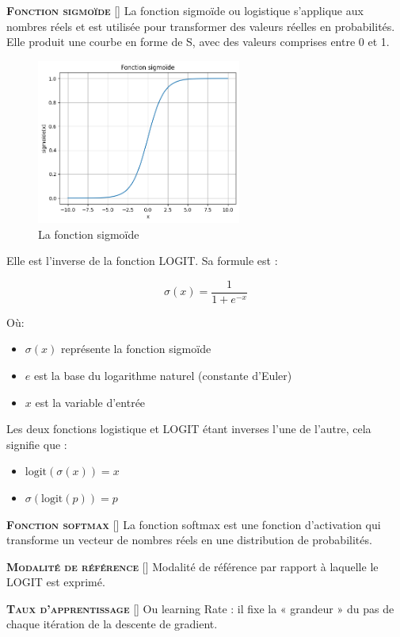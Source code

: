 \documentclass[10pt,french]{report}
\newcommand{\entreelex}[3][]{%
	{\large \textbf{\textsc{#2}}} %
	\if\relax\detokenize{#1}\relax %
	\else %
	\raisebox{0.15ex}{\scalebox{0.7}{$\Diamond$}} %
	[#1] %
	\fi
	\raisebox{0.13ex}{\scalebox{0.75}{$\blacksquare$}} #3 %
}
\begin{document}
	 \label{fonction sigmoïde}
	 \entreelex{Fonction sigmoïde}{La fonction sigmoïde ou logistique s'applique aux nombres réels et est utilisée pour transformer des valeurs réelles en probabilités. Elle produit une courbe en forme de S, avec des valeurs comprises entre 0 et 1.

	 \begin{figure}[h]
	 	\centering
	 	\includegraphics[width=0.6\textwidth]{f_sigmoide.png}
	 	\caption{La fonction sigmoïde}
	 	\label{fig:mesh1}
	 \end{figure}

	 Elle est l'inverse de la fonction LOGIT. Sa formule est :

 	\begin{equation}
 		\sigma(x) = \frac{1}{1 + e^{-x}}
 	\end{equation}

 	Où:
 	\begin{itemize}
 		\item $\sigma(x)$ représente la fonction sigmoïde
 		\item $e$ est la base du logarithme naturel (constante d'Euler)
 		\item $x$ est la variable d'entrée
 	\end{itemize}

 	Les deux fonctions logistique et LOGIT étant inverses l'une de l'autre, cela signifie que :
 	\begin{itemize}
 		\item $\text{logit}(\sigma(x)) = x$
 		\item $\sigma(\text{logit}(p)) = p$
	 \end{itemize}}

	 \label{fonction softmax}
	 \entreelex{Fonction softmax}{La fonction softmax est une fonction d'activation qui transforme un vecteur de nombres réels en une distribution de probabilités.}

	\entreelex{Modalité de référence}{Modalité de référence par rapport à laquelle le LOGIT est exprimé.}

	\label{taux apprentissag}
	\entreelex{Taux d'apprentissage}{Ou learning Rate : il fixe la « grandeur » du pas de chaque itération de la descente de gradient.}

	\listoffigures

    \printbibliography
\end{document}
